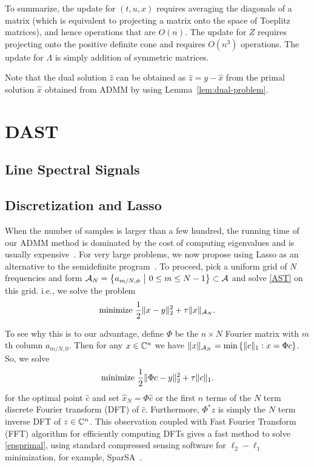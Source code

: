 To summarize, the update for $(t,u,x)$ requires averaging the diagonals of a
matrix (which is equivalent to projecting a matrix onto the space of Toeplitz
matrices), and hence operations that are $O(n)$. The update for $Z$ requires
projecting onto the positive definite cone and requires $O(n^3)$ operations. The update for $\Lambda$ is simply
addition of symmetric matrices.  

Note that the dual solution $\hat{z}$ can be obtained as $\hat{z} = y - \hat{x}$ from the
primal solution $\hat{x}$ obtained from ADMM by using
Lemma~\ref{lem:dual-problem}.

\section{DAST}
\subsection{Line Spectral Signals}
\subsection{Discretization and Lasso}
\label{sec:comp-method}
When the number of samples is larger than a few hundred, the running time of
our ADMM method is dominated by the cost of computing eigenvalues and is
usually expensive~\cite{12BhaskarArxiv}. For very large problems, we now propose using Lasso as an
alternative to the semidefinite program~. To proceed, pick a
uniform grid of $N$ frequencies and form $\mathcal{A}_N = \left\{ a_{m/N,\phi}
~\middle|~ 0 \leq m \leq N-1 \right\} \subset \mathcal{A} $ and solve \eqref{AST} on
this grid. i.e., we solve the problem
\begin{equation}
	\label{epsprimal} \text{minimize }\frac{1}{2} \lVert x - y\rVert_2^2 + \tau \lVert x\rVert_{\mathcal{A}_N}. 
\end{equation}

To see why this is to our advantage, define $\Phi$ be the $n \times N$ Fourier
matrix with $m$th column $a_{m/N,0}$. Then for any $x \in \mathbb{C}^n$ we have $\lVert x\rVert_{\mathcal{A}_N} = \min\left\{ \lVert c\rVert_1: x = \Phi c \right\}$.
So, we solve
\begin{equation}
	\label{sparsa} \text{minimize }\frac{1}{2} \lVert\Phi c- y\rVert_2^2 + \tau \lVert c\rVert_1. 
\end{equation}
for the optimal point $\hat{c}$ and set $\hat{x}_N = \Phi \hat{c}$ or the first
$n$ terms of the $N$ term discrete Fourier transform (DFT) of $\hat{c}$.
Furthermore, $\Phi^* z$ is simply the $N$ term inverse DFT of $z \in \mathbb{C}^n$.
This observation coupled with Fast Fourier Transform (FFT) algorithm for
efficiently computing DFTs gives a fast method to solve \eqref{epsprimal},
using standard compressed sensing software for $\ell_2-\ell_1$ minimization,
for example, SparSA~\cite{wright09}.

